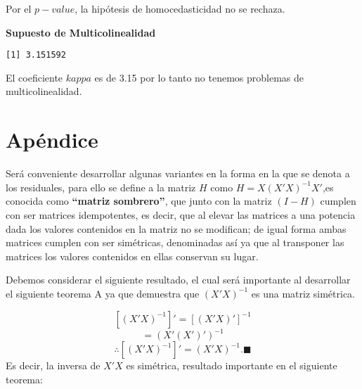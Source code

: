 \documentclass[
  a4paper,
  oneside,
  openany]{book}
\newenvironment{Shaded}{\begin{snugshade}}{\end{snugshade}}
\newcommand{\DecValTok}[1]{\textcolor[rgb]{0.00,0.00,0.81}{#1}}
\newcommand{\FunctionTok}[1]{\textcolor[rgb]{0.00,0.00,0.00}{#1}}
\newcommand{\NormalTok}[1]{#1}
\newcommand{\OtherTok}[1]{\textcolor[rgb]{0.56,0.35,0.01}{#1}}
\newcommand{\SpecialCharTok}[1]{\textcolor[rgb]{0.00,0.00,0.00}{#1}}
\begin{document}
Por el \(p-value\), la hipótesis de homocedasticidad no se rechaza.

\textbf{Supuesto de Multicolinealidad}

\begin{Shaded}
\end{Shaded}

\begin{verbatim}
[1] 3.151592
\end{verbatim}

El coeficiente \(kappa\) es de 3.15 por lo tanto no tenemos problemas de multicolinealidad.

\hypertarget{apuxe9ndice}{%
\chapter{Apéndice}\label{apuxe9ndice}}

Será conveniente desarrollar algunas variantes en la forma en la que se denota a los residuales, para ello se define a la matriz \(H\) como \(H=X(X'X)^{-1}X'\),es conocida como \textbf{``matriz sombrero''}, que junto con la matriz \((I-H)\) cumplen con ser matrices idempotentes, es decir, que al elevar las matrices a una potencia dada los valores contenidos en la matriz no se modifican; de igual forma ambas matrices cumplen con ser simétricas, denominadas así ya que al transponer las matrices los valores contenidos en ellas conservan su lugar.

Debemos considerar el siguiente resultado, el cual será importante al desarrollar el siguiente teorema A ya que demuestra que \((X'X)^{-1}\) es una matriz simétrica.

\[[(X'X)^{-1}]'=[(X'X)']^{-1}\]
\[=(X'(X')')^{-1}\]
\[\therefore [(X'X)^{-1}]'= (X'X)^{-1}. \blacksquare\]
Es decir, la inversa de \(X'X\) es simétrica, resultado importante en el siguiente teorema:
\end{document}
